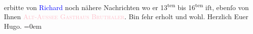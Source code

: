                erbitte von \textcolor{blue}{Richard}{}\ledrightnote{\textcolor{blue}{Richard Beer-Hofmann}} noch nähere Nachrichten wo
               er 13\textsuperscript{ten} bis 16\textsuperscript{ten} iſt, ebenſo von Ihnen\pend
           \pstart
           \textsc{\textcolor{pink}{Alt-Aussee Gasthaus Bru{\geminationn}thaler}{}\ledrightnote{\textcolor{pink}{Gasthaus Brunnthaler}}}.\pend
           \pstart
           Bin ſehr erholt und wohl.\pend
           \pstart
           Herzlich Euer{\\[\baselineskip]}\spacefill\mbox{Hugo.}\pend
           \leftskip=0em{}\endnumbering{}  
      